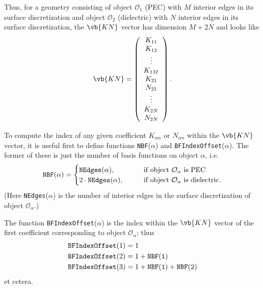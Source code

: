 Thus, for a geometry consisting of object $\mathcal{O}_1$ (PEC)
with $M$ interior edges in its surface discretization
and object $\mathcal{O}_2$ (dielectric) with $N$ interior edges
in its surface discretization, the $\vb{KN}$ vector has dimension
$M+2N$ and looks like
$$ \vb{KN}=\left(\begin{array}{c}
   K_{11} \\ 
   K_{12} \\ 
   \vdots \\
   K_{1M} \\ 
   K_{21} \\ 
   N_{21} \\ 
   \vdots \\
   K_{2N} \\ 
   N_{2N}
   \end{array}\right).
$$

To compute the index of any given coefficient $K_{\alpha n}$ 
or $N_{\alpha n}$ within the $\vb{KN}$ vector,
it is useful first to define functions \texttt{NBF}($\alpha$) 
and \texttt{BFIndexOffset}($\alpha$). The former of these 
is just the number of basis functions on object $\alpha$,
i.e.
$$ \texttt{NBF}(\alpha) = 
   \begin{cases}
   \texttt{NEdges}(\alpha), \qquad &\text{if object $\mathcal{O}_\alpha$
                                          is PEC} \\
   2\cdot \tt{NEdges}(\alpha), 
                        \qquad &\text{if object $\mathcal{O}_\alpha$
                                      is dielectric.} \\
   \end{cases}
$$
(Here \texttt{NEdges}($\alpha$) is the number of interior edges 
in the surface discretization of object $\mathcal{O}_\alpha$.)

The function \texttt{BFIndexOffset}($\alpha$) is the index
within the $\vb{KN}$ vector of the first coefficient corresponding
to object $\mathcal{O}_\alpha$; thus 
\begin{align*}
 \texttt{BFIndexOffset}(1) &= 1 \\
 \texttt{BFIndexOffset}(2) &= 1 + \tt{NBF}(1) \\
 \texttt{BFIndexOffset}(3) &= 1 + \tt{NBF}(1) + \tt{NBF}(2)
\end{align*}
et cetera.

